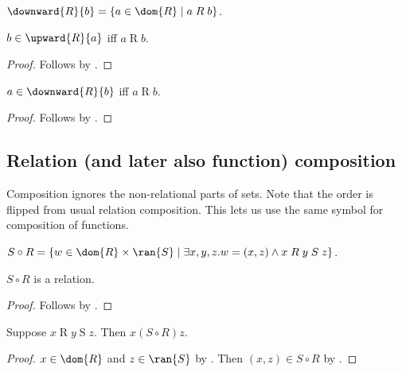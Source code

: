 \begin{definition}\label{downward_closure}
    $\downward{R}{b} = \{a\in\dom{R} \mid a\mathrel{R}b \}$.
\end{definition}

\begin{proposition}\label{upward_closure_iff}
    $b\in\upward{R}{a}$ iff $a\mathrel{R}b$.
\end{proposition}
\begin{proof}
    Follows by .
\end{proof}

\begin{proposition}\label{downward_closure_iff}
    $a\in\downward{R}{b}$ iff $a\mathrel{R}b$.
\end{proposition}
\begin{proof}
    Follows by .
\end{proof}

\subsection{Relation (and later also function) composition}

Composition ignores the non-relational parts of sets.
Note that the order is flipped from usual relation composition.
This lets us use the same symbol for composition of functions.

\begin{definition}\label{circ}
    $S\circ R = \{ w\in\dom{R}\times\ran{S}\mid
        \exists x, y, z. w = (x,z)\land x\mathrel{R}y\mathrel{S}z \}$.
\end{definition}

\begin{proposition}\label{circ_is_relation}
    $S\circ R$ is a relation.
\end{proposition}
\begin{proof}
    Follows by .
\end{proof}

\begin{proposition}\label{circ_elem_intro}
    Suppose $x\mathrel{R} y\mathrel{S} z$.
    Then $x\mathrel{(S\circ R)} z$.
\end{proposition}
\begin{proof}
    $x\in\dom{R}$ and $z\in\ran{S}$ by .
    Then $(x, z)\in S\circ R$ by .
\end{proof}

